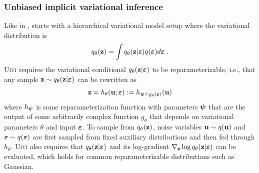 \documentclass[10pt]{article}
\begin{document}
\subsubsection{Unbiased implicit variational inference}

Like in \sivi, \uivi starts with a hierarchical variational model setup where the variational distribution is
\[
q_\theta(\mathbf{z}) = \int q_\theta(\mathbf{z}|\bm{\varepsilon})q(\bm{\varepsilon})d\bm{\varepsilon} \;.
\]
\textsc{Uivi} requires the variational conditional $q_\theta(\mathbf{z}|\bm{\varepsilon})$ to be reparameterizable, i.e., that any sample $\mathbf{z}\sim q_\theta(\mathbf{z}|\bm{\varepsilon})$ can be rewritten as
\[
\mathbf{z} = h_\theta(\mathbf{u};\bm{\varepsilon}) := h_{\bm{\psi}=g_\theta(\bm{\varepsilon})}(\mathbf{u}) 
\]
where $h_{\bm{\psi}}$ is some reparameterization function with parameters $\bm{\psi}$ that are the output of some arbitrarily complex function $g_\theta$ that depends on variational parameters $\theta$ and input $\bm{\varepsilon}$. To sample from $q_\theta(\mathbf{z})$, noise variables $\mathbf{u}\sim q(\mathbf{u})$ and $\bm{\varepsilon}\sim q(\bm{\varepsilon})$ are first sampled from fixed auxiliary distributions and then fed through $h_\theta$. \textsc{Uivi} also requires that $q_\theta(\mathbf{z}|\bm{\varepsilon})$ and its log-gradient $\nabla_{\mathbf{z}}\log q_\theta(\mathbf{z}|\bm{\varepsilon})$ can be evaluated, which holds for common reparameterizable distributions such as Gaussian.
\\
\end{document}
